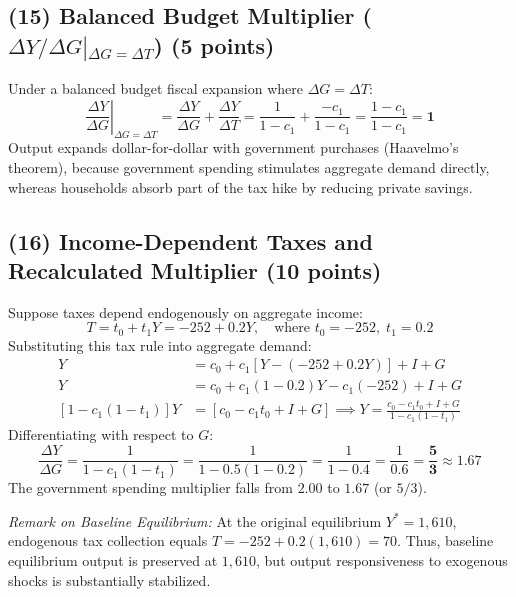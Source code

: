 \documentclass[11pt,a4paper]{article}
\begin{document}
\subsection*{(15) Balanced Budget Multiplier ($\left. \Delta Y / \Delta G \right\vert{}_{\Delta G = \Delta T}$) (5 points)}
Under a balanced budget fiscal expansion where $\Delta G = \Delta T$:
\begin{equation}
    \left. \frac{\Delta Y}{\Delta G} \right|_{\Delta G = \Delta T} = \frac{\Delta Y}{\Delta G} + \frac{\Delta Y}{\Delta T} = \frac{1}{1 - c_1} + \frac{-c_1}{1 - c_1} = \frac{1 - c_1}{1 - c_1} = \mathbf{1}
\end{equation}
Output expands dollar-for-dollar with government purchases (Haavelmo's theorem), because government spending stimulates aggregate demand directly, whereas households absorb part of the tax hike by reducing private savings.

\subsection*{(16) Income-Dependent Taxes and Recalculated Multiplier (10 points)}
Suppose taxes depend endogenously on aggregate income:
\begin{equation}
    T = t_0 + t_1 Y = -252 + 0.2 Y, \quad \text{where } t_0 = -252, \; t_1 = 0.2
\end{equation}
Substituting this tax rule into aggregate demand:
\begin{align}
    Y &= c_0 + c_1[Y - (-252 + 0.2Y)] + I + G \\
    Y &= c_0 + c_1(1 - 0.2)Y - c_1(-252) + I + G \\
    [1 - c_1(1 - t_1)] Y &= [c_0 - c_1 t_0 + I + G] \implies Y = \frac{c_0 - c_1 t_0 + I + G}{1 - c_1(1 - t_1)}
\end{align}
Differentiating with respect to $G$:
\begin{equation}
    \frac{\Delta Y}{\Delta G} = \frac{1}{1 - c_1(1 - t_1)} = \frac{1}{1 - 0.5(1 - 0.2)} = \frac{1}{1 - 0.4} = \frac{1}{0.6} = \mathbf{\frac{5}{3}} \approx \mathbf{1.67}
\end{equation}
The government spending multiplier falls from $2.00$ to $\mathbf{1.67}$ (or $5/3$).

\textit{Remark on Baseline Equilibrium:} At the original equilibrium $Y^* = 1,610$, endogenous tax collection equals $T = -252 + 0.2(1,610) = 70$. Thus, baseline equilibrium output is preserved at $1,610$, but output responsiveness to exogenous shocks is substantially stabilized.
\end{document}
